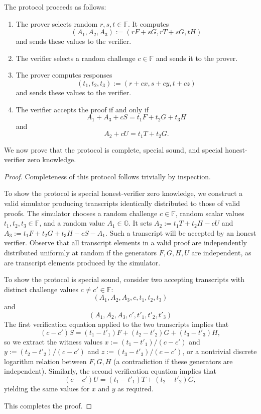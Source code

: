 \documentclass{llncs}
\newcommand{\G}{\mathbb{G}}
\newcommand{\F}{\mathbb{F}}
\begin{document}
The protocol proceeds as follows:
\begin{enumerate}
    \item The prover selects random $r,s,t \in \F$.
    It computes $$(A_1, A_2, A_3) := (rF + sG, rT + sG, tH)$$ and sends these values to the verifier.
    \item The verifier selects a random challenge $c \in \F$ and sends it to the prover.
    \item The prover computes responses $$(t_1, t_2, t_3) := (r + cx, s + cy, t + cz)$$ and sends these values to the verifier.
    \item The verifier accepts the proof if and only if $$A_1 + A_3 + cS = t_1 F + t_2 G + t_3 H$$ and $$A_2 + cU = t_1 T + t_2 G.$$
\end{enumerate}

We now prove that the protocol is complete, special sound, and special honest-verifier zero knowledge.

\begin{proof}
Completeness of this protocol follows trivially by inspection.

To show the protocol is special honest-verifier zero knowledge, we construct a valid simulator producing transcripts identically distributed to those of valid proofs.
The simulator chooses a random challenge $c \in \F$, random scalar values $t_1, t_2, t_3 \in \F$, and a random value $A_1 \in \G$.
It sets $A_2 := t_1 T + t_2 H - cU$ and $A_3 := t_1 F + t_2 G + t_3 H - cS - A_1$.
Such a transcript will be accepted by an honest verifier.
Observe that all transcript elements in a valid proof are independently distributed uniformly at random if the generators $F,G,H,U$ are independent, as are transcript elements produced by the simulator.

To show the protocol is special sound, consider two accepting transcripts with distinct challenge values $c \neq c' \in \F$:
$$(A_1, A_2, A_3, c, t_1, t_2, t_3)$$
and
$$(A_1, A_2, A_3, c', t'_1, t'_2, t'_3)$$
The first verification equation applied to the two transcripts implies that $$(c - c')S = (t_1 - t'_1)F + (t_2 - t'_2)G + (t_3 - t'_3)H,$$ so we extract the witness values $x := (t_1 - t'_1)/(c - c')$ and $y := (t_2 - t'_2)/(c - c')$ and $z := (t_3 - t'_3)/(c - c')$, or a nontrivial discrete logarithm relation between $F,G,H$ (a contradiction if these generators are independent).
Similarly, the second verification equation implies that $$(c - c')U = (t_1 - t'_1)T + (t_2 - t'_2)G,$$ yielding the same values for $x$ and $y$ as required.

This completes the proof.
\end{proof}
\end{document}
